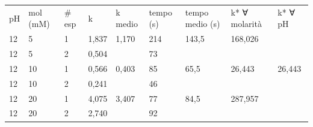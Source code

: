 \begin{center}
\begin{tabular}{lllllllll}
pH & mol (mM) & \# esp & k           & k medio     & tempo (s) & tempo medio (s) & k* ∀ molarità & k* ∀ pH     \\
12 & 5             & 1              & 1,837 & 1,170 & 214       & 143,5           & 168,026    \\
12 & 5             & 2              & 0,504 &             & 73        &                 &               &             \\
12 & 10            & 1              & 0,566 & 0,403 & 85        & 65,5            & 26,443   & 26,443 \\
12 & 10            & 2              & 0,241 &             & 46        &                 &               &             \\
12 & 20            & 1              & 4,075 & 3,407 & 77        & 84,5            & 287,957   &             \\
12 & 20            & 2              & 2,740 &             & 92        &                 &               &            
\end{tabular}
\end{center}
















